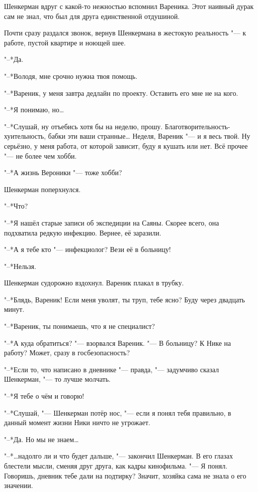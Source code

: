 Шенкерман вдруг с какой-то нежностью вспомнил Вареника.
Этот наивный дурак сам не знал, что был для друга единственной отдушиной.

Почти сразу раздался звонок, вернув Шенкермана в жестокую реальность "--- к работе, пустой квартире и ноющей шее.

"--*Да.

"--*Володя, мне срочно нужна твоя помощь.

"--*Вареник, у меня завтра дедлайн по проекту.
Оставить его мне не на кого.

"--*Я понимаю, но\ldots{}

"--*Слушай, ну отъебись хотя бы на неделю, прошу.
Благотворительность-хуительность, бабки эти ваши странные\ldots{}
Неделя, Вареник "--- и я весь твой.
Ну серьёзно, у меня работа, от которой зависит, буду я кушать или нет.
Всё прочее "--- не более чем хобби.

"--*А жизнь Вероники "--- тоже хобби?

Шенкерман поперхнулся.

"--*Что?

"--*Я нашёл старые записи об экспедиции на Саяны.
Скорее всего, она подхватила редкую инфекцию.
Вернее, её заразили.

"--*А я тебе кто "--- инфекциолог?
Вези её в больницу!

"--*Нельзя.

Шенкерман судорожно вздохнул.
Вареник плакал в трубку.

"--*Блядь, Вареник!
Если меня уволят, ты труп, тебе ясно?
Буду через двадцать минут.

\asterism

"--*Вареник, ты понимаешь, что я не специалист?

"--*А куда обратиться? "--- взорвался Вареник.
"--- В больницу?
К Нике на работу?
Может, сразу в госбезопасность?

"--*Если то, что написано в дневнике "--- правда, "--- задумчиво сказал Шенкерман, "--- то лучше молчать.

"--*Я тебе о чём и говорю!

"--*Слушай, "--- Шенкерман потёр нос, "--- если я понял тебя правильно, в данный момент жизни Ники ничто не угрожает.

"--*Да.
Но мы не знаем\ldots{}

"--*\ldots{}надолго ли и что будет дальше, "--- закончил Шенкерман.
В его глазах блестели мысли, сменяя друг друга, как кадры кинофильма.
"--- Я понял.
Говоришь, дневник тебе дали на подтирку?
Значит, хозяйка сама не знала о его значении.

